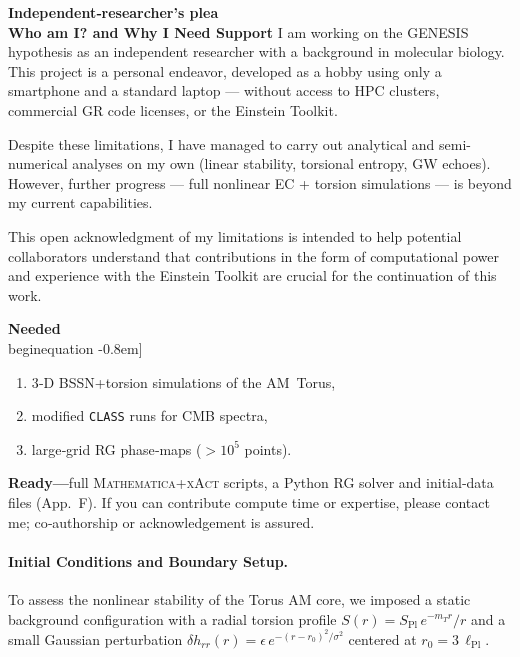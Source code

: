 \documentclass{article}
\begin{document}
\begin{tcolorbox}[
  enhanced,
  width=\linewidth,
  colframe=black,
  colback=gray!8,
  coltitle=white,
  colbacktitle=black,
  title=Call for Collaboration,
  fonttitle=\bfseries,
  left=2mm, right=2mm, top=1mm, bottom=1mm,
  boxrule=0.4pt
]
\textbf{Independent‑researcher’s plea}\\
\textbf{Who am I? and Why I Need Support}
I am working on the GENESIS hypothesis as an independent researcher with a background in molecular biology. This project is a personal endeavor, developed as a hobby using only a smartphone and a standard laptop — without access to HPC clusters, commercial GR code licenses, or the Einstein Toolkit.

Despite these limitations, I have managed to carry out analytical and semi-numerical analyses on my own (linear stability, torsional entropy, GW echoes). However, further progress — full nonlinear EC + torsion simulations — is beyond my current capabilities.

This open acknowledgment of my limitations is intended to help potential collaborators understand that contributions in the form of computational power and experience with the Einstein Toolkit are crucial for the continuation of this work.

\medskip
\textbf{Needed}\\begin{equation}\label{eq:auto25}
-0.8em]
\begin{enumerate}
  \item 3‑D BSSN{+}torsion simulations of the AM Torus,
  \item modified \texttt{CLASS} runs for CMB spectra,
  \item large‑grid RG phase‑maps ($>10^{5}$ points).
\end{enumerate}

\medskip
\textbf{Ready—}full \textsc{Mathematica{+}xAct} scripts, a Python RG solver and initial‑data files (App.~F).  
If you can contribute compute time or expertise, please contact me; co‑authorship or acknowledgement is assured.
\end{tcolorbox}

\paragraph{Initial Conditions and Boundary Setup.}
To assess the nonlinear stability of the Torus AM core, we imposed a static background configuration
with a radial torsion profile $S(r) = S_{\text{Pl}} \, e^{-m_T r}/r$ and a small Gaussian perturbation
$\delta h_{rr}(r) = \epsilon \, e^{-(r - r_0)^2 / \sigma^2}$ centered at $r_0 = 3\,\ell_{\text{Pl}}$.
\end{document}

